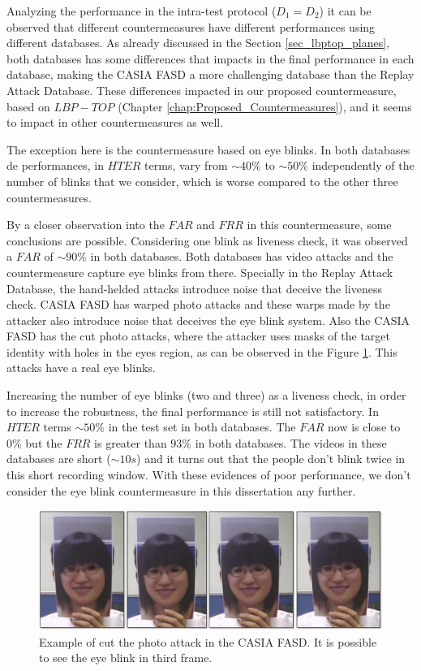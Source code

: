 Analyzing the performance in the intra-test protocol ($D_1 = D_2$) it can be observed that different countermeasures have different performances using different databases. As already discussed in the Section \ref{sec_lbptop_planes}, both databases has some differences that impacts in the final performance in each database, making the CASIA FASD a more challenging database than the Replay Attack Database. These differences impacted in our proposed countermeasure, based on $LBP-TOP$ (Chapter \ref{chap:Proposed_Countermeasures}), and it seems to impact in other countermeasures as well.

The exception here is the countermeasure based on eye blinks. In both databases de performances, in $HTER$ terms, vary from $\sim40\%$ to $\sim50\%$ independently of the number of blinks that we consider, which is worse compared to the other three countermeasures.

By a closer observation into the $FAR$ and $FRR$ in this countermeasure, some conclusions are possible. Considering one blink as liveness check, it was observed a $FAR$ of $\sim 90\%$ in both databases. Both databases has video attacks and the countermeasure capture eye blinks from there. Specially in the Replay Attack Database, the hand-helded attacks introduce noise that deceive the liveness check. CASIA FASD has warped photo attacks and these warps made by the attacker also introduce noise that deceives the eye blink system. Also the CASIA FASD has the cut photo attacks, where the attacker uses masks of the target identity with holes in the eyes region, as can be observed in the Figure \ref{fig:blink_scene}. This attacks have a real eye blinks. 

Increasing the number of eye blinks (two and three) as a liveness check, in order to increase the robustness, the final performance is still not satisfactory. In $HTER$ terms $\sim 50\%$ in the test set in both databases. The $FAR$ now is close to $0\%$ but the $FRR$ is greater than $93\%$ in both databases. The videos in these databases are short ($\sim10s$) and it turns out that the people don't blink twice in this short recording window. With these evidences of poor performance, we don't consider the eye blink countermeasure in this dissertation any further.

\begin{figure}[!btb]
\begin{center}
\includegraphics [width=18cm] {images/blink_scene.pdf}
\caption[Example of the cut photo attack in the CASIA FASD]{Example of cut the photo attack in the CASIA FASD. It is possible to see the eye blink in third frame.}
\label{fig:blink_scene}
\end{center}
\end{figure}

